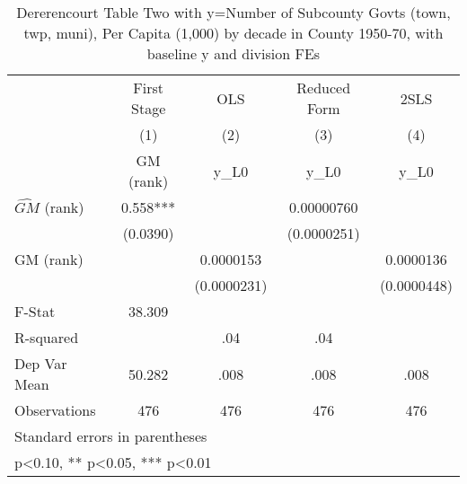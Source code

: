 \begin{table}[htbp]\centering
\def\sym#1{\ifmmode^{#1}\else\(^{#1}\)\fi}
\caption{Dererencourt Table Two with y=Number of Subcounty Govts (town, twp, muni), Per Capita (1,000) by decade in County 1950-70, with baseline y and division FEs}
\begin{tabular}{l*{4}{c}}
\toprule
                    & First Stage   &         OLS   &Reduced Form   &        2SLS   \\
                    &\multicolumn{1}{c}{(1)}&\multicolumn{1}{c}{(2)}&\multicolumn{1}{c}{(3)}&\multicolumn{1}{c}{(4)}\\
                    &\multicolumn{1}{c}{GM  (rank)}&\multicolumn{1}{c}{y\_L0}&\multicolumn{1}{c}{y\_L0}&\multicolumn{1}{c}{y\_L0}\\
\midrule
$\hat{GM}$ (rank)   &       0.558***&               &  0.00000760   &               \\
                    &    (0.0390)   &               & (0.0000251)   &               \\
\addlinespace
GM  (rank)          &               &   0.0000153   &               &   0.0000136   \\
                    &               & (0.0000231)   &               & (0.0000448)   \\
\midrule
F-Stat              &      38.309   &               &               &               \\
R-squared           &               &         .04   &         .04   &               \\
Dep Var Mean        &      50.282   &        .008   &        .008   &        .008   \\
Observations        &         476   &         476   &         476   &         476   \\
\bottomrule
\multicolumn{5}{l}{\footnotesize Standard errors in parentheses}\\
\multicolumn{5}{l}{\footnotesize * p<0.10, ** p<0.05, *** p<0.01}\\
\end{tabular}
\end{table}
